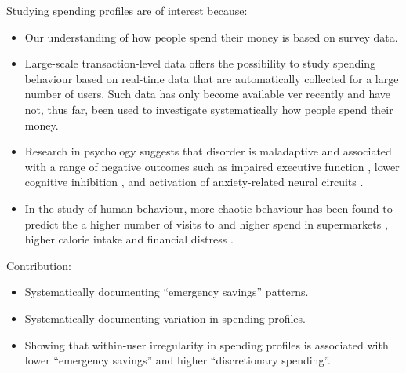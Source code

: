 Studying spending profiles are of interest because:
\begin{itemize}

    \item Our understanding of how people spend their money is based on survey
        data.

    \item Large-scale transaction-level data offers the possibility to study
        spending behaviour based on real-time data that are automatically
        collected for a large number of users. Such data has only become
        available ver recently and have not, thus far, been used to investigate
        systematically how people spend their money.

    \item Research in psychology suggests that disorder is maladaptive and
        associated with a range of negative outcomes such as impaired executive
        function \citep{vernon2016predictors}, lower cognitive inhibition
        \citep{mittal2015cognitive}, and activation of anxiety-related neural
        circuits \citep{hirsh2012psychological}.

    \item In the study of human behaviour, more chaotic behaviour has been
        found to predict the a higher number of visits to and higher spend in
        supermarkets \citep{guidotti2015behavioral}, higher calorie intake
        \citep{skatova2019those} and financial distress
        \citep{muggleton2020evidence}.

\end{itemize}


Contribution:
\begin{itemize}

    \item Systematically documenting ``emergency savings'' patterns.

    \item Systematically documenting variation in spending profiles.

    \item Showing that within-user irregularity in spending profiles is
        associated with lower ``emergency savings'' and higher ``discretionary
        spending''.

\end{itemize}


